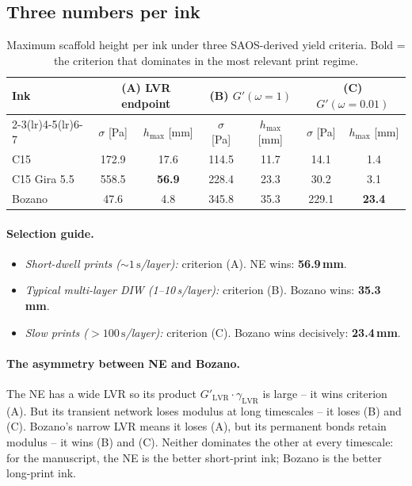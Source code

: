 \documentclass[11pt,a4paper]{article}
\begin{document}
\subsection{Three numbers per ink}

\begin{table}[h]
\centering\small
\begin{tabular}{lcccccc}
\toprule
\multirow{2}{*}{Ink}
 & \multicolumn{2}{c}{(A) LVR endpoint}
 & \multicolumn{2}{c}{(B) $G'(\omega=1)$}
 & \multicolumn{2}{c}{(C) $G'(\omega=0.01)$} \\
\cmidrule(lr){2-3}\cmidrule(lr){4-5}\cmidrule(lr){6-7}
 & $\sigma$ [\si{\Pa}] & $h_\mathrm{max}$ [\si{\mm}]
 & $\sigma$ [\si{\Pa}] & $h_\mathrm{max}$ [\si{\mm}]
 & $\sigma$ [\si{\Pa}] & $h_\mathrm{max}$ [\si{\mm}] \\
\midrule
C15           & 172.9 & 17.6 & 114.5 & 11.7 & 14.1  & 1.4  \\
C15 Gira 5.5  & 558.5 & \textbf{56.9} & 228.4 & 23.3 & 30.2 & 3.1  \\
Bozano        & 47.6  & 4.8  & 345.8 & 35.3 & 229.1 & \textbf{23.4} \\
\bottomrule
\end{tabular}
\caption{Maximum scaffold height per ink under three SAOS-derived yield
criteria. Bold = the criterion that dominates in the most relevant print
regime.}
\label{tab:hmax_three_criteria}
\end{table}

\paragraph{Selection guide.}
\begin{itemize}[leftmargin=1.6em,itemsep=3pt]
\item \emph{Short-dwell prints ($\sim 1\,\si{\s}$/layer):} criterion (A).
  NE wins: \textbf{56.9\,\si{\mm}}.
\item \emph{Typical multi-layer DIW (1--10\,\si{\s}/layer):} criterion (B).
  Bozano wins: \textbf{35.3\,\si{\mm}}.
\item \emph{Slow prints ($>100\,\si{\s}$/layer):} criterion (C).
  Bozano wins decisively: \textbf{23.4\,\si{\mm}}.
\end{itemize}

\paragraph{The asymmetry between NE and Bozano.}
The NE has a wide LVR so its product $G'_\mathrm{LVR}\cdot\gamma_\mathrm{LVR}$
is large -- it wins criterion (A). But its transient network loses modulus
at long timescales -- it loses (B) and (C). Bozano's narrow LVR means
it loses (A), but its permanent bonds retain modulus -- it wins (B) and
(C). Neither dominates the other at every timescale: for the manuscript,
the NE is the better short-print ink; Bozano is the better long-print
ink.
\end{document}
